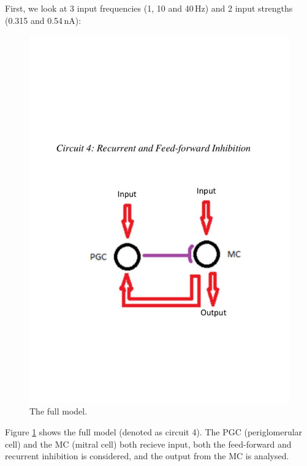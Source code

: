 \documentclass[11pt]{report}
\begin{document}
First, we look at 3 input frequencies (1, 10 and 40\,Hz) and 2 input strengths (0.315 and 0.54\,nA):
\begin{figure}[!ht]
\centering
\includegraphics[trim={0 6cm 0 8cm},clip, scale=0.5]{Figures/Circuit_4.pdf}
\caption{The full model.}
\label{fig:Circuit_4}
\end{figure} 

Figure \ref{fig:Circuit_4} shows the full model (denoted as circuit 4). The PGC (periglomerular cell) and the MC (mitral cell) both recieve input, both the feed-forward and recurrent inhibition is considered, and the output from the MC is analysed. 
\newpage
\end{document}
